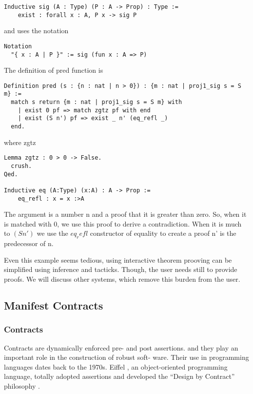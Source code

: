 \begin{verbatim}
Inductive sig (A : Type) (P : A -> Prop) : Type :=
    exist : forall x : A, P x -> sig P
\end{verbatim}

and uses the notation

\begin{verbatim}
Notation
  "{ x : A | P }" := sig (fun x : A => P)
\end{verbatim}    
    
    
The definition of pred function is

\begin{verbatim}
Definition pred (s : {n : nat | n > 0}) : {m : nat | proj1_sig s = S m} :=
  match s return {m : nat | proj1_sig s = S m} with
    | exist 0 pf => match zgtz pf with end
    | exist (S n') pf => exist _ n' (eq_refl _)
  end.
\end{verbatim}

where zgtz

\begin{verbatim}
Lemma zgtz : 0 > 0 -> False.
  crush.
Qed.

Inductive eq (A:Type) (x:A) : A -> Prop :=
    eq_refl : x = x :>A
\end{verbatim}

The argument is a number n and a proof that it is greater
than zero.
So, when it is matched with 0, we use this proof to derive a contradiction.
When it is much to $(S n')$ we use the $eq_refl$ constructor of equality to 
create a proof n' is the predecessor of n.


Even this example seems tedious, using interactive theorem prooving can be simplified
using inference and tacticks. Though, the user needs still to provide proofs.
We will discuss other systems, which remove this burden from the user.

\subsection{Manifest Contracts}

\subsubsection{Contracts}
Contracts are dynamically enforced pre- and post assertions.
and they play an important role in the construction of robust soft- 
ware. 
Their use in programming languages dates back to the 1970s. 
Eiffel \cite{Eiffel}, an object-oriented programming language,
totally adopted assertions and developed the 
``Design by Contract'' philosophy \cite{Meyer92}.


